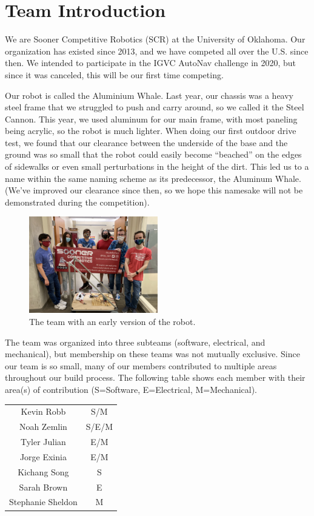 \section{Team Introduction}

We are Sooner Competitive Robotics (SCR) at the University of Oklahoma. Our organization has existed since 2013, and we have competed all over the U.S. since then. We intended to participate in the IGVC AutoNav challenge in 2020, but since it was canceled, this will be our first time competing. 

Our robot is called the Aluminium Whale. Last year, our chassis was a heavy steel frame that we struggled to push and carry around, so we called it the Steel Cannon. This year, we used aluminum for our main frame, with most paneling being acrylic, so the robot is much lighter. When doing our first outdoor drive test, we found that our clearance between the underside of the base and the ground was so small that the robot could easily become ``beached'' on the edges of sidewalks or even small perturbations in the height of the dirt. This led us to a name within the same naming scheme as its predecessor, the Aluminum Whale. (We've improved our clearance since then, so we hope this namesake will not be demonstrated during the competition). 

\begin{figure}[h]
    \centering
    \includegraphics[width=0.5\textwidth]{images/team.jpg}
    \caption{The team with an early version of the robot.}
\end{figure}

The team was organized into three subteams (software, electrical, and mechanical), but membership on these teams was not mutually exclusive. Since our team is so small, many of our members contributed to multiple areas throughout our build process. The following table shows each member with their area(s) of contribution (S=Software, E=Electrical, M=Mechanical). 

\begin{center}
\begin{tabular}{|c c|}
    \hline
    Kevin Robb & S/M \\
    Noah Zemlin & S/E/M \\
    Tyler Julian & E/M \\
    Jorge Exinia & E/M \\
    Kichang Song & S \\
    Sarah Brown & E \\
    Stephanie Sheldon & M \\
    \hline
\end{tabular}
\end{center}


